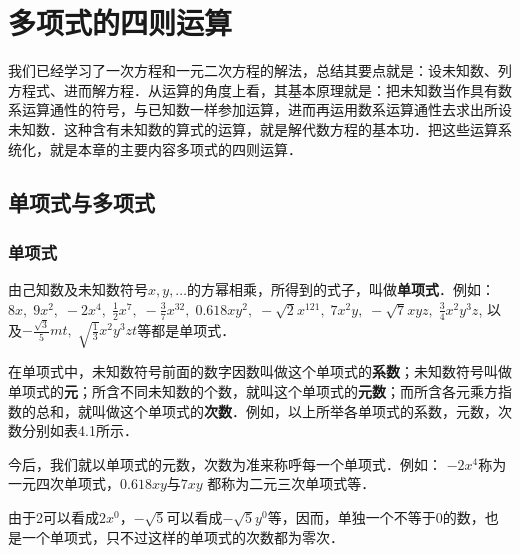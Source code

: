 \chapter{多项式的四则运算}

我们已经学习了一次方程和一元二次方程的解法，总结其要点就是：设未知数、列方程式、进而解方程．从运算的角度上看，其基本原理就是：把未知数当作具有数系运算通性的符号，与已知数一样参加运算，进而再运用数系运算通性去求出所设未知数．这种含有未知数的算式的运算，就是解代数方程的基本功．把这些运算系统化，就是本章的主要内容多项式的四则运算．

\section{单项式与多项式}
\subsection{单项式}
由己知数及未知数符号$x,y,\ldots$的方幂相乘，所得到的式子，叫做\textbf{单项式}．例如：
$8x,\; 9x^2,\; -2x^4,\; \frac{1}{2}x^7,\; -\frac{3}{7}x^{32},\; 0.618xy^2,\; -\sqrt{2}x^{121},\; 7x^2y,\; -\sqrt{7}xyz,\; \frac{3}{4}x^2y^3z$, 以及$-\frac{\sqrt{3}}{5}mt,\; \sqrt{\frac{1}{3}}x^2y^3zt$等都是单项式．

在单项式中，未知数符号前面的数字因数叫做这个单项式的\textbf{系数}；未知数符号叫做单项式的\textbf{元}；所含不同未知数的个数，就叫这个单项式的\textbf{元数}；而所含各元乘方指数的总和，就叫做这个单项式的\textbf{次数}．例如，以上所举各单项式的系数，元数，次数分别如表4.1所示．


今后，我们就以单项式的元数，次数为准来称呼每一个单项式．例如：
$-2x^4$称为一元四次单项式，$0.618xy$与$7xy$
都称为二元三次单项式等．

由于2可以看成$2x^0$，$-\sqrt{5}$可以看成$-\sqrt{5}y^0$等，因而，单独一个不等于0的数，也是一个单项式，只不过这样的单项式的次数都为零次．


